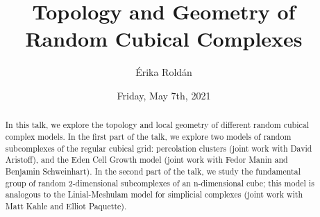 \documentclass{UAmathtalk}
\author{\'{E}rika Rold\'{a}n}
\title{Topology and Geometry of Random Cubical Complexes}
\date{Friday, May 7th, 2021}
\begin{document}
\maketitle

%

\begin{abstract}
In this talk, we explore the topology and local geometry of different random cubical complex models. In the first part of the talk, we explore two models of random subcomplexes of the regular cubical grid: percolation clusters (joint work with David Aristoff), and the Eden Cell Growth model (joint work with Fedor Manin and Benjamin Schweinhart). In the second part of the talk, we study the fundamental group of random 2-dimensional subcomplexes of an n-dimensional cube; this model is analogous to the Linial-Meshulam model for simplicial complexes (joint work with Matt Kahle and Elliot Paquette).
\end{abstract}
\end{document}
